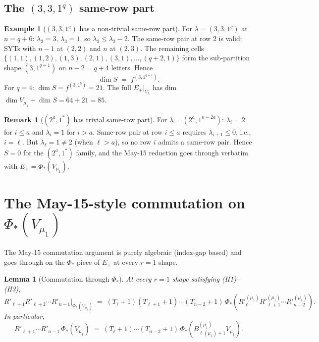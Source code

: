 \documentclass[11pt]{article}
\newtheorem{lemma}[theorem]{Lemma}
\theoremstyle{definition}
\newtheorem{remark}[theorem]{Remark}
\newtheorem{example}[theorem]{Example}
\begin{document}
\subsection{The $(3, 3, 1^q)$ same-row part}

\begin{example}[$(3, 3, 1^q)$ has a non-trivial same-row part]\label{ex:331-same-row}
For $\lambda = (3, 3, 1^q)$ at $n = q + 6$: $\lambda_2 = 3$, $\lambda_3 = 1$,
so $\lambda_3 \le \lambda_2 - 2$. The same-row pair at row $2$ is valid:
SYTs with $n-1$ at $(2, 2)$ and $n$ at $(2, 3)$. The remaining cells
$\{(1, 1), (1, 2), (1, 3), (2, 1), (3, 1), \ldots, (q+2, 1)\}$ form the
sub-partition shape $(3, 1^{q+1})$ on $n - 2 = q + 4$ letters. Hence
\[
   \dim S \;=\; f^{(3, 1^{q+1})}.
\]
For $q = 4$: $\dim S = f^{(3, 1^5)} = 21$. The full $E_+|_{V_\lambda}$
has dim $\dim V_{\mu_1} + \dim S = 64 + 21 = 85$.
\end{example}

\begin{remark}[$(2^a, 1^*)$ has trivial same-row part]\label{rem:2a-no-same-row}
For $\lambda = (2^a, 1^{n-2a})$: $\lambda_i = 2$ for $i \le a$ and
$\lambda_i = 1$ for $i > a$. Same-row pair at row $i \le a$ requires
$\lambda_{i+1} \le 0$, i.e., $i = \ell$. But $\lambda_\ell = 1 \ne 2$
(when $\ell > a$), so no row $i$ admits a same-row pair. Hence
$S = 0$ for the $(2^a, 1^*)$ family, and the May-15 reduction goes
through verbatim with $E_+ = \Phi_*(V_{\mu_1})$.
\end{remark}

\section{The May-15-style commutation on $\Phi_*(V_{\mu_1})$}\label{sec:commute}

The May-15 commutation argument is purely algebraic (index-gap based)
and goes through on the $\Phi_*$-piece of $E_+$ at every $r = 1$
shape.

\begin{lemma}[Commutation through $\Phi_*$]\label{lem:Phi-commute}
At every $r = 1$ shape satisfying (H1)--(H3),
\begin{equation}\label{eq:commute}
   R'_{\ell+1} R'_{\ell+2}\cdots R'_{n-1}\big|_{\Phi_*(V_{\mu_1})}
   \;=\;
   (T_\ell{+}1)(T_{\ell+1}{+}1)\cdots(T_{n-2}{+}1)\,
   \Phi_*\!\left(R'^{(\mu_1)}_\ell R'^{(\mu_1)}_{\ell+1}\cdots R'^{(\mu_1)}_{n-2}\right).
\end{equation}
In particular,
\[
   R'_{\ell+1}\cdots R'_{n-1}\,\Phi_*(V_{\mu_1})
   \;=\;
   (T_\ell{+}1)\cdots(T_{n-2}{+}1)\,\Phi_*(B_{\ell(\mu_1)+1}^{(\mu_1)} V_{\mu_1}).
\]
\end{lemma}
\end{document}
